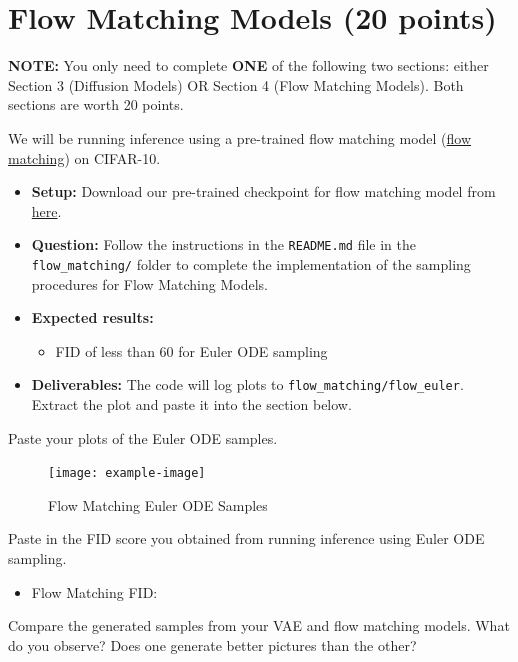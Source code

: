 \documentclass[11pt,addpoints,answers]{exam}
\numberwithin{equation}{section} %
\numberwithin{figure}{section} %
\numberwithin{table}{section} %
\begin{document}
\newpage
\section{Flow Matching Models (20 points)}
\begin{notebox}
\textbf{NOTE:} You only need to complete \textbf{ONE} of the following two sections: either Section 3 (Diffusion Models) OR Section 4 (Flow Matching Models). Both sections are worth 20 points.
\end{notebox}

We will be running inference using a pre-trained flow matching model (\href{https://arxiv.org/abs/2210.02747}{flow matching}) on CIFAR-10. 
\begin{itemize}
\item \textbf{Setup:} Download our pre-trained checkpoint for flow matching model from \href{https://drive.google.com/file/d/16B8a_bElSnCLsNppTQOed7eUwsMcaxv6/view?usp=sharing}{here}.
\item \textbf{Question:} Follow the instructions in the \texttt{README.md} file in the \texttt{flow\_matching/} folder to complete the implementation of the sampling procedures for Flow Matching Models.
\item \textbf{Expected results:} 
    \begin{itemize}
        \item FID of less than 60 for Euler ODE sampling
    \end{itemize}
\item \textbf{Deliverables:} The code will log plots to \texttt{flow\_matching/flow\_euler}. Extract the plot and paste it into the section below. 
\end{itemize}
\begin{questions}
\question Paste your plots of the Euler ODE samples.
\begin{solution}
\begin{figure}[H]
    \centering
    \texttt{[image: example-image]}
    \caption{Flow Matching Euler ODE Samples}
\end{figure}
\end{solution}
\question Paste in the FID score you obtained from running inference using Euler ODE sampling.
\begin{solution}
\begin{itemize}
    \item Flow Matching FID:
\end{itemize} 
\end{solution}
\question Compare the generated samples from your VAE and flow matching models. What do you observe? Does one generate better pictures than the other?
\begin{solution}
    \\
\end{solution}

\end{questions}
\end{document}
